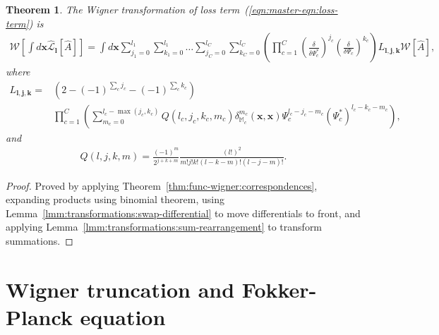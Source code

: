 \documentclass[12pt,aip,jmp,amssymb,amsmath]{revtex4-1}
\newcommand{\jvec}{\boldsymbol{j}}
\newcommand{\kvec}{\boldsymbol{k}}
\newcommand{\lvec}{\boldsymbol{l}}
\newcommand{\xvec}{\boldsymbol{x}}
\newcommand{\restbasis}{\mathbb{M}}
\newcommand{\eqnref}[1]{(\ref{eqn:#1})}
\newcommand{\thmref}[1]{Theorem~\ref{thm:#1}}
\newcommand{\lmmref}[1]{Lemma~\ref{lmm:#1}}
\newtheorem{theorem}{Theorem}
\begin{document}
\begin{theorem}
\label{thm:transformations:w-losses}
    The Wigner transformation of loss term~\eqnref{master-eqn:loss-term} is
    \begin{equation*}\begin{split}
        \mathcal{W} \left[ \int d\xvec \hat{\mathcal{L}}_{\lvec} [\hat{A}] \right]
        = \int d\xvec
            \sum_{j_1=0}^{l_1} \sum_{k_1=0}^{l_1} \ldots
            \sum_{j_C=0}^{l_C} \sum_{k_C=0}^{l_C}
                \left(
                    \prod_{c=1}^C
                        \left( \frac{\delta}{\delta \Psi_c^*} \right)^{j_c}
                        \left( \frac{\delta}{\delta \Psi_c} \right)^{k_c}
                \right)
                L_{\lvec, \jvec, \kvec}
            \mathcal{W}[\hat{A}],
    \end{split}\end{equation*}
    where
    \begin{equation*}\begin{split}
        L_{\lvec, \jvec, \kvec}
        ={} & \left( 2 - (-1)^{\sum_c j_c} - (-1)^{\sum_c k_c} \right) \\
        &   \prod_{c=1}^C \left(
                \sum_{m_c=0}^{l_c - \max(j_c, k_c)}
                Q(l_c, j_c, k_c, m_c)
                \delta_{\restbasis_c}^{m_c}(\xvec, \xvec)
                \Psi_c^{l_c - j_c - m_c}
                (\Psi_c^*)^{l_c - k_c - m_c}
            \right),
    \end{split}\end{equation*}
    and
    \begin{equation*}\begin{split}
        Q(l, j, k, m)
        = \frac{(-1)^m}{2^{j + k + m}}
            \frac{(l!)^2}{m! j! k! (l - k - m)! (l - j - m)!}.
    \end{split}\end{equation*}
\end{theorem}
\begin{proof}
Proved by applying \thmref{func-wigner:correspondences}, expanding products using binomial theorem, using \lmmref{transformations:swap-differential} to move differentials to front, and applying \lmmref{transformations:sum-rearrangement} to transform summations.
\end{proof}



\section{Wigner truncation and Fokker-Planck equation}
\end{document}
